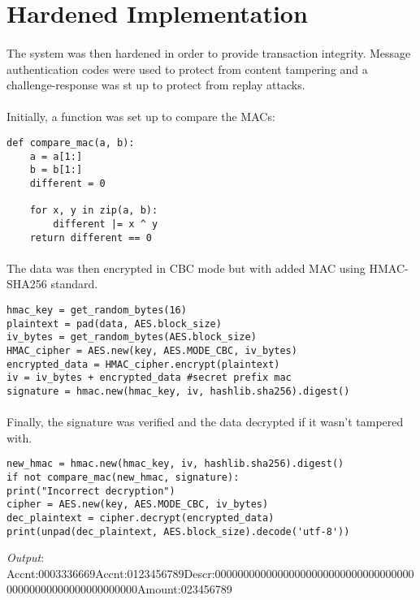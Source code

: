 \section{Hardened Implementation}
\paragraph{ }The system was then hardened in order to provide transaction integrity. Message authentication codes were used to protect from content tampering and a challenge-response was st up to protect from replay attacks.

\paragraph{ }Initially, a function was set up to compare the MACs:
\begin{lstlisting}
def compare_mac(a, b):
	a = a[1:] 
	b = b[1:]
	different = 0

	for x, y in zip(a, b):
		different |= x ^ y
	return different == 0
\end{lstlisting}

\paragraph{ }The data was then encrypted in CBC mode but with added MAC using HMAC-SHA256 standard.
\begin{lstlisting}
hmac_key = get_random_bytes(16)
plaintext = pad(data, AES.block_size)
iv_bytes = get_random_bytes(AES.block_size)
HMAC_cipher = AES.new(key, AES.MODE_CBC, iv_bytes)
encrypted_data = HMAC_cipher.encrypt(plaintext)
iv = iv_bytes + encrypted_data #secret prefix mac
signature = hmac.new(hmac_key, iv, hashlib.sha256).digest()
\end{lstlisting}

\paragraph{ }Finally, the signature was verified and the data decrypted if it wasn't tampered with.
\begin{lstlisting}
new_hmac = hmac.new(hmac_key, iv, hashlib.sha256).digest()
if not compare_mac(new_hmac, signature):
print("Incorrect decryption")
cipher = AES.new(key, AES.MODE_CBC, iv_bytes)
dec_plaintext = cipher.decrypt(encrypted_data)
print(unpad(dec_plaintext, AES.block_size).decode('utf-8'))
\end{lstlisting}
\textit{Output}: Accnt:0003336669Accnt:0123456789Descr:00000000000000000000000000000000000\\00000000000000000000000Amount:023456789

